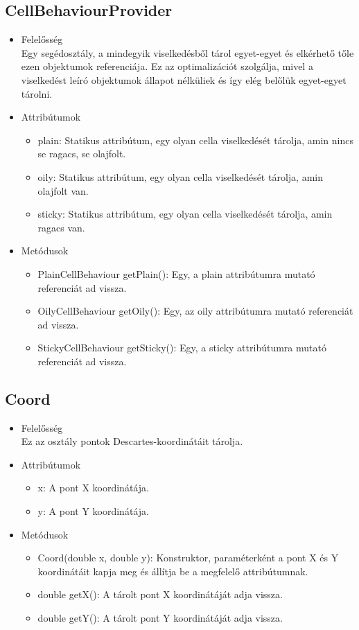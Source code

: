 \subsection{CellBehaviourProvider}
\begin{itemize}
	\item Felelősség\\
	Egy segédosztály, a mindegyik viselkedésből tárol egyet-egyet és elkérhető tőle ezen objektumok referenciája. Ez az optimalizációt szolgálja, mivel a viselkedést leíró objektumok állapot nélküliek és így elég belőlük egyet-egyet tárolni.
	\item Attribútumok
	\begin{itemize}
		\item plain: Statikus attribútum, egy olyan cella viselkedését tárolja, amin nincs se ragacs, se olajfolt.
		\item oily: Statikus attribútum, egy olyan cella viselkedését tárolja, amin olajfolt van.
		\item sticky: Statikus attribútum, egy olyan cella viselkedését tárolja, amin ragacs van.
	\end{itemize}
	\item Metódusok
	\begin{itemize}
		\item PlainCellBehaviour getPlain(): Egy, a plain attribútumra mutató referenciát ad vissza.
		\item OilyCellBehaviour getOily(): Egy, az oily attribútumra mutató referenciát ad vissza.
		\item StickyCellBehaviour getSticky(): Egy, a sticky attribútumra mutató referenciát ad vissza.		
	\end{itemize}
\end{itemize}

\subsection{Coord}
\begin{itemize}
	\item Felelősség\\
	Ez az osztály pontok Descartes-koordinátáit tárolja.
	\item Attribútumok
	\begin{itemize}
		\item x: A pont X koordinátája.
		\item y: A pont Y koordinátája.
	\end{itemize}
	\item Metódusok
	\begin{itemize}
		\item Coord(double x, double y): Konstruktor, paraméterként a pont X és Y koordinátáit kapja meg és állítja be a megfelelő attribútumnak.
		\item double getX(): A tárolt pont X koordinátáját adja vissza.
		\item double getY(): A tárolt pont Y koordinátáját adja vissza.
	\end{itemize}
\end{itemize}


